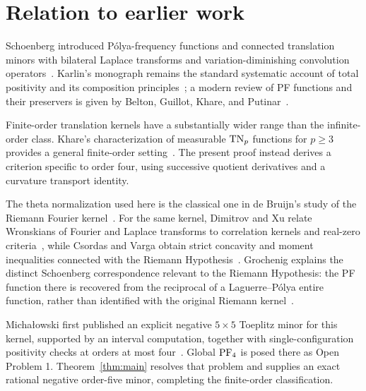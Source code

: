 \section{Relation to earlier work}\label{sec:related-work}

Schoenberg introduced P\'olya-frequency functions and connected translation
minors with bilateral Laplace transforms and variation-diminishing convolution
operators~\cite{schoenberg-ii,belton}. Karlin's monograph remains the
standard systematic account of total positivity and its composition
principles~\cite{karlin}; a modern review of PF functions and their preservers
is given by Belton, Guillot, Khare, and Putinar~\cite{belton}.

Finite-order translation kernels have a substantially wider range than the
infinite-order class. Khare's characterization of measurable \(\mathrm{TN}_p\)
functions for \(p\geq3\) provides a general finite-order setting~\cite{khare}.
The present proof instead derives a criterion specific to order four, using
successive quotient derivatives and a curvature transport identity.

The theta normalization used here is the classical one in de Bruijn's study of
the Riemann Fourier kernel~\cite{debruijn}. For the same kernel, Dimitrov and Xu
relate Wronskians of Fourier and Laplace transforms to correlation kernels and
real-zero criteria~\cite{dimitrov-xu}, while Csordas and Varga obtain strict
concavity and moment inequalities connected with the Riemann
Hypothesis~\cite{csordas-varga}. Grochenig explains the distinct Schoenberg
correspondence relevant to the Riemann Hypothesis: the PF function there is
recovered from the reciprocal of a Laguerre--P\'olya entire function, rather than
identified with the original Riemann kernel~\cite{grochenig}.

Micha\l{}owski first published an explicit negative \(5\times5\) Toeplitz
minor for this kernel, supported by an interval computation, together with
single-configuration positivity checks at orders at most
four~\cite{michalowski}. Global \(\mathrm{PF}_4\) is posed there as Open Problem 1.
Theorem~\ref{thm:main} resolves that problem and supplies an exact rational
negative order-five minor, completing the finite-order classification.
